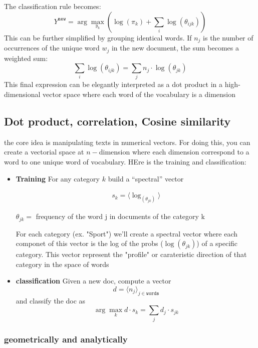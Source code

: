 The classification rule becomes:
\[
    Y^{\texttt{new}} = \arg\max_{y_k} \left( \log(\pi_k) + \sum_i \log(\theta_{ijk}) \right)
\]
This can be further simplified by grouping identical words. If $n_j$ is the number of occurrences of the unique word $w_j$ in the new document, the sum becomes a weighted sum:
\[
    \sum_i \log(\theta_{ijk}) = \sum_j n_j \cdot \log(\theta_{jk})
\]
This final expression can be elegantly interpreted as a dot product in a high-dimensional vector space where each word of the vocabulary is a dimension

\subsection{Dot product, correlation, Cosine similarity}
the core idea is manipulating texts in numerical vectors. For doing this, you can create a vectorial space at $n-$dimension where each dimension correspond to a word to one unique word of vocabulary. HEre is the training and classification:
\begin{itemize}
    \item \textbf{Training}
    For any category $k$ build a “spectral” vector
    \begin{center}
        \begin{align*}
            s_k =\langle  \log_{(\theta_{jk})} \rangle
        \end{align*}
    \end{center}

    $\theta_{jk}=$ frequency of the word j in documents of the category k

    For each category (ex. "Sport") we'll create a spectral vector where each componet of this vector is the log of the probs ($\log{(\theta_{jk})}$) of a specific category. This vector represent the "profile" or carateristic direction of that category in the space of words

    
    \item \textbf{classification}
    Given a new doc, compute a vector
    \[
        d = \langle n_j \rangle_{j\in \texttt{words}}
    \]
    and classify the doc as
    \[
        \arg \max_k d\cdot s_k =\sum_{j}d_j\cdot s_{jk}
    \]
\end{itemize}

\subsubsection{geometrically and analytically}

